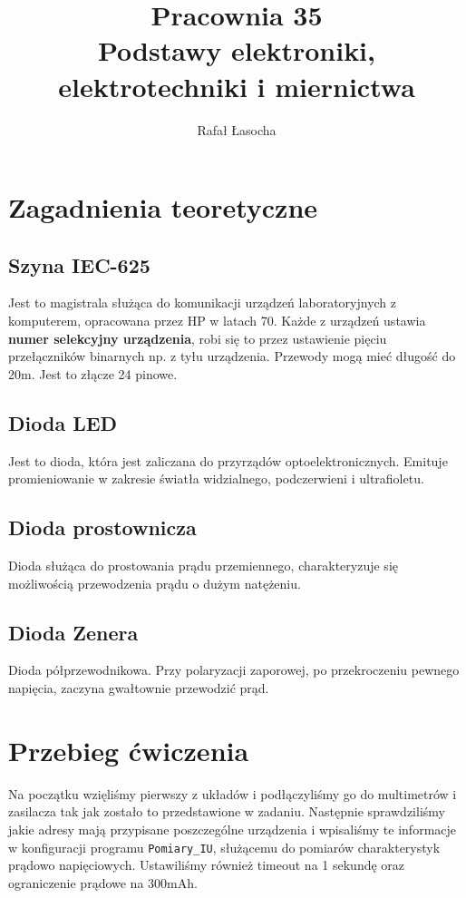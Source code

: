 \documentclass[a4paper,11pt]{article}
\title{
  \textbf{Pracownia 35}\\
  {\Large Podstawy elektroniki, elektrotechniki i miernictwa}
}
\author{Rafał Łasocha}
\begin{document}
\maketitle

\section{Zagadnienia teoretyczne}

\subsection{Szyna IEC-625}
Jest to magistrala służąca do komunikacji urządzeń laboratoryjnych z komputerem, opracowana przez HP w latach 70. Każde z urządzeń ustawia \textbf{numer selekcyjny urządzenia}, robi się to przez ustawienie pięciu przełączników binarnych np. z tyłu urządzenia. Przewody mogą mieć długość do 20m. Jest to złącze 24 pinowe.

\subsection{Dioda LED}
Jest to dioda, która jest zaliczana do przyrządów optoelektronicznych. Emituje promieniowanie w zakresie światła widzialnego, podczerwieni i ultrafioletu.

\subsection{Dioda prostownicza}
Dioda służąca do prostowania prądu przemiennego, charakteryzuje się możliwością przewodzenia prądu o dużym natężeniu.

\subsection{Dioda Zenera}
Dioda półprzewodnikowa. Przy polaryzacji zaporowej, po przekroczeniu pewnego napięcia, zaczyna gwałtownie przewodzić prąd.


\section{Przebieg ćwiczenia}

Na początku wzięliśmy pierwszy z układów i podłączyliśmy go do multimetrów i zasilacza tak jak zostało to przedstawione w zadaniu. Następnie sprawdziliśmy jakie adresy mają przypisane poszczególne urządzenia i wpisaliśmy te informacje w konfiguracji programu \texttt{Pomiary\_IU}, służącemu do pomiarów charakterystyk prądowo napięciowych. Ustawiliśmy również timeout na 1 sekundę oraz ograniczenie prądowe na 300mAh.
\end{document}
